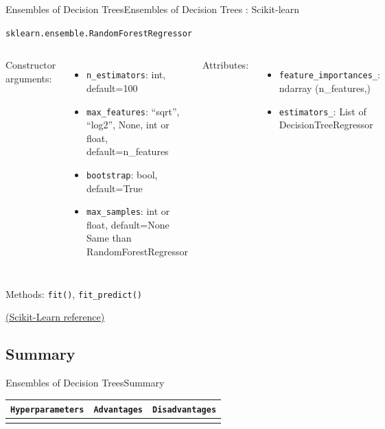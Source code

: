 \documentclass[10pt,compress]{beamer} %
\begin{document}
{\begin{frame}{Ensembles of Decision Trees}{Ensembles of Decision Trees : Scikit-learn}
\begin{exampleblock}{\texttt{sklearn.ensemble.RandomForestRegressor}}
         \begin{columns}[T]
                Constructor arguments:
                \begin{itemize}
                    \item \texttt{n\_estimators}: int, default=100
                    \item \texttt{max\_features}: {“sqrt”, “log2”, None}, int or float, default=n\_features
                    \item \texttt{bootstrap}: bool, default=True
                    \item \texttt{max\_samples}: int or float, default=None
                    Same than RandomForestRegressor
                \end{itemize}

                Attributes:
                \begin{itemize}
                    \item \texttt{feature\_importances\_}: ndarray (n\_features,)
                    \item \texttt{estimators\_}: List of DecisionTreeRegressor
                \end{itemize}
            \end{columns}

            \medskip

            Methods: \texttt{fit()}, \texttt{fit\_predict()}
        \end{exampleblock}

        \medskip

        \centering \href{https://scikit-learn.org/stable/modules/generated/sklearn.ensemble.RandomForestRegressor.html}{(Scikit-Learn reference)}
    \end{frame}
}{}

\subsection{Summary}
\begin{frame}{Ensembles of Decision Trees}{Summary}
	\begin{center}
	\begin{tabular}{cp{3cm}p{3cm}}\hline
	 	\texttt{Hyperparameters}  & \texttt{Advantages}  & \texttt{Disadvantages} \\\hline
	 	                          &                               &   \\
	 	\hline
	\end{tabular}
	\end{center}
\end{frame}
\end{document}
